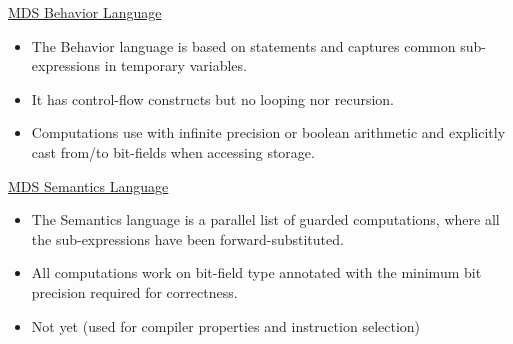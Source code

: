\documentclass[a4]{seminar}
\begin{document}
\begin{slide}

\begin{center} \underline{MDS Behavior Language} \end{center}

\begin{itemize}

\item The Behavior language is based on statements and captures common
sub-expressions in temporary variables.

\item It has control-flow constructs but no looping nor recursion.

\item Computations use with infinite precision or boolean arithmetic and
explicitly cast from/to bit-fields when accessing storage.

\end{itemize}

\begin{center} \underline{MDS Semantics Language} \end{center}

\begin{itemize}

\item The Semantics language is a parallel list of guarded computations, where
all the sub-expressions have been forward-substituted.

\item All computations work on bit-field type annotated with the minimum bit
precision required for correctness.

\item Not yet (used for compiler properties and instruction selection)

\end{itemize}

\end{slide}
\end{document}
